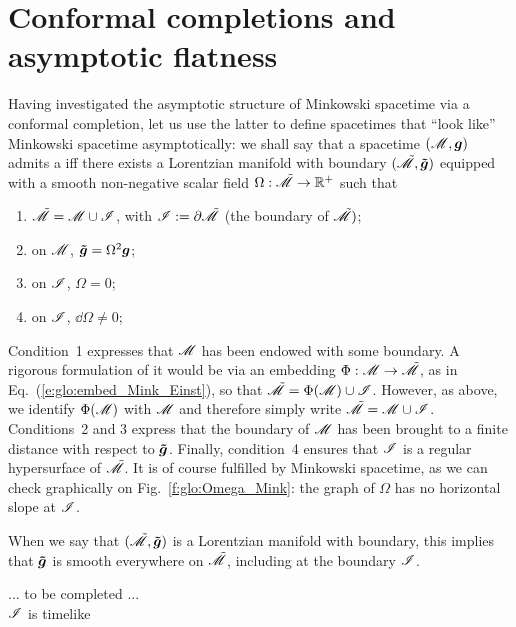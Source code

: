 \section{Conformal completions and asymptotic flatness} \label{s:glo:conf_compl}

Having investigated the asymptotic structure of Minkowski spacetime
via a conformal completion, let us use the latter to define spacetimes
that ``look like'' Minkowski spacetime asymptotically: we
shall say that a spacetime $(\mathscr{M},\bm{g})$ admits a
iff there exists a Lorentzian manifold with boundary
$(\tilde{\mathscr{M}},\bm{\tilde{g}})$ equipped with a smooth non-negative scalar field
$\Omega: \tilde{\mathscr{M}} \rightarrow \mathbb{R}^+$
such that
\begin{enumerate}
\item $\tilde{\mathscr{M}} = \mathscr{M} \cup \mathscr{I}$, with $\mathscr{I} := \partial \tilde{\mathscr{M}}$
(the boundary of $\tilde{\mathscr{M}})$;
\item on $\mathscr{M}$, $\bm{\tilde{g}} = \Omega^2 \bm{g}$;
\item on $\mathscr{I}$, $\Omega=0$;
\item on $\mathscr{I}$, $\dd \Omega \not= 0$;
\end{enumerate}
Condition~1 expresses that $\mathscr{M}$ has been endowed with some boundary.
A rigorous formulation of it would be via an embedding $\Phi:\mathscr{M} \rightarrow \tilde{\mathscr{M}}$,
as in Eq.~(\ref{e:glo:embed_Mink_Einst}), so that
$\tilde{\mathscr{M}} = \Phi(\mathscr{M}) \cup \mathscr{I}$. However, as above, we identify $\Phi(\mathscr{M})$
with $\mathscr{M}$ and therefore simply write $\tilde{\mathscr{M}} = \mathscr{M} \cup \mathscr{I}$.
Conditions~2 and 3 express that the boundary of $\mathscr{M}$ has been brought to a
finite distance with respect to $\bm{\tilde{g}}$. Finally, condition~4 ensures
that $\mathscr{I}$ is a regular hypersurface of $\tilde{\mathscr{M}}$.
It is of course fulfilled by Minkowski spacetime, as we can check graphically
on Fig.~\ref{f:glo:Omega_Mink}: the graph of $\Omega$ has no horizontal slope
at $\mathscr{I}$.

\begin{remark}
When we say that $(\tilde{\mathscr{M}},\bm{\tilde{g}})$ is a Lorentzian manifold with
boundary, this implies that $\bm{\tilde{g}}$ is smooth everywhere on $\tilde{\mathscr{M}}$,
including at the boundary $\mathscr{I}$.
\end{remark}

\begin{example}
... to be completed ... \\
$\mathscr{I}$ is timelike
\end{example}

